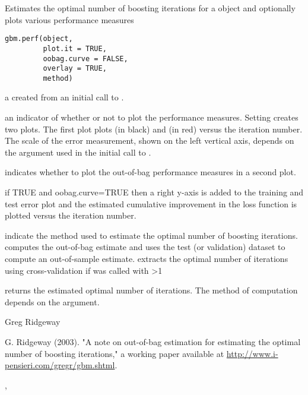 \documentclass{article}
\begin{document}
\begin{Description}\relax
Estimates the optimal number of boosting iterations for a  object and
optionally plots various performance measures
\end{Description}
\begin{Usage}
\begin{verbatim}
gbm.perf(object, 
         plot.it = TRUE, 
         oobag.curve = FALSE, 
         overlay = TRUE, 
         method)
\end{verbatim}
\end{Usage}
\begin{Arguments}
\begin{ldescription}
\item[\code{object}] a  created from an initial call to 
.
\item[\code{plot.it}] an indicator of whether or not to plot the performance measures.
Setting  creates two plots. The first plot plots 
 (in black) and  (in red) 
versus the iteration number. The scale of the error measurement, shown on the 
left vertical axis, depends on the  argument used in the 
initial call to .
\item[\code{oobag.curve}] indicates whether to plot the out-of-bag performance measures
in a second plot.
\item[\code{overlay}] if TRUE and oobag.curve=TRUE then a right y-axis is added to the 
training and test error plot and the estimated cumulative improvement in the loss 
function is plotted versus the iteration number.
\item[\code{method}] indicate the method used to estimate the optimal number
of boosting iterations.  computes the out-of-bag
estimate and  uses the test (or validation) dataset 
to compute an out-of-sample estimate.  extracts the 
optimal number of iterations using cross-validation if  was called
with >1
\end{ldescription}
\end{Arguments}
\begin{Value}
 returns the estimated optimal number of iterations. The method 
of computation depends on the  argument.
\end{Value}
\begin{Author}\relax
Greg Ridgeway 
\end{Author}
\begin{References}\relax
G. Ridgeway (2003). "A note on out-of-bag estimation for estimating the optimal
number of boosting iterations," a working paper available at
\url{http://www.i-pensieri.com/gregr/gbm.shtml}.
\end{References}
\begin{SeeAlso}\relax
{}, 
\end{SeeAlso}
\end{document}
